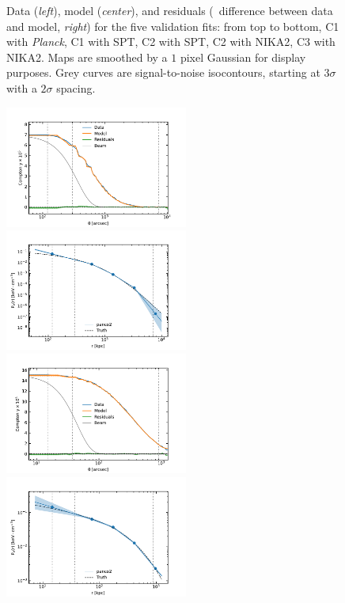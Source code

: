 \begin{figure}[t]
    \caption{
        Data (\textit{left}), model (\textit{center}), and residuals (\ie\ difference between data and model, \textit{right}) for the five validation fits:
        from top to bottom, C1 with \textit{Planck}, C1 with SPT, C2 with SPT, C2 with NIKA2, C3 with NIKA2.
        Maps are smoothed by a $1$ pixel Gaussian for display purposes.
        Grey curves are signal-to-noise isocontours, starting at $3\sigma$ with a $2\sigma$ spacing.
    }
    \label{fig:valid:dmr_2d}
\end{figure}


\begin{figure}[t]
    \centering
    \includegraphics[height=4cm, trim={0 0 1cm 0.5cm}, clip]{../validation/results/C1/Planck/data_model_residuals_profiles.pdf}
    \includegraphics[height=4cm, trim={0 0 1cm 0.5cm}, clip]{../validation/results/C1/Planck/pressure_profile.pdf} \\
    \includegraphics[height=4cm, trim={0 0 1cm 0.5cm}, clip]{../validation/results/C1/SPT/data_model_residuals_profiles.pdf}
    \includegraphics[height=4cm, trim={0 0 1cm 0.5cm}, clip]{../validation/results/C1/SPT/pressure_profile.pdf} \\

\end{figure}

